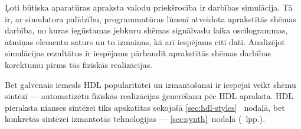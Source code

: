 Ļoti būtiska aparatūras apraksta valodu priekšrocība ir darbības simulācija.
Tā ir, ar simulatora palīdzību, programmatūras līmenī 
atveidota aprakstītās shēmas darbība, no kuras iegūstamas jebkuru
shēmas signālvadu laika oscilogrammas, atmiņas elementu saturs un to izmaiņas,
kā arī iespējams citi dati. Analizējot simulācijas rezultātus ir 
iespējams pārbaudīt aprakstītās shēmas darbības korektumu pirms
tās fiziskās realizācijas.

Bet galvenais iemesls HDL popularitātei un izmantošanai ir iespējai veikt 
shēmu sintēzi --- automatizētu fiziskās realizācijas ģenerēšanu pēc HDL apraksta.%
\cite{HDL}\cite{Perry-VHDL}\cite{Vahid-RTL}
HDL pieraksta nianses sintēzei tiks apskatītas sekojošā \ref{sec:hdl-styles}~%
nodaļā, bet konkrētās sintēzei izmantotās tehnoloģijas --- 
\ref{sec:synth}~nodaļā (\pageref{sec:synth}~lpp.).\pagebreak[1]



		



